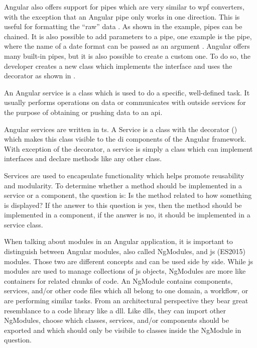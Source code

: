 Angular also offers support for pipes which are very similar to \gls{wpf} converters, with the exception that an Angular pipe only works in one direction. This is useful for formatting the \enquote{raw} data \zB {}. As shown in the example, pipes can be chained. It is also possible to add parameters to a pipe, one example is the  pipe, where the name of a date format can be passed as an argument \zB {}. Angular offers many built-in pipes, but it is also possible to create a custom one. To do so, the developer creates a new class which implements the  interface and uses the  decorator as shown in . \cite{angularTemplateSyntax}




An Angular service is a class which is used to do a specific, well-defined task. It usually performs operations on data or communicates with outside services for the purpose of obtaining or pushing data to an \gls{api}.


Angular services are written in \gls{ts}. A Service is a class with the  decorator () which makes this class visible to the \gls{di} components of the Angular framework. With exception of the decorator, a service is simply a class which can implement interfaces and declare methods like any other class.

Services are used to encapsulate functionality which helps promote reusability and modularity. To determine whether a method should be implemented in a service or a component, the question is: Is the method related to how something is displayed? If the answer to this question is yes, then the method should be implemented in a component, if the answer is no, it should be implemented in a service class.



When talking about modules in an Angular application, it is important to distinguish between Angular modules, also called NgModules, and \gls{js} (ES2015) modules. Those two are different concepts and can be used side by side. While \gls{js} modules are used to manage collections of \gls{js} objects, NgModules are more like containers for related chunks of code. An NgModule contains components, services, and/or other code files which all belong to one domain, a workflow, or are performing similar tasks. From an architectural perspective they bear great resemblance to a code library like a \gls{dll}. Like \gls{dll}s, they can import other NgModules, choose which classes, services, and/or components should be exported and which should only be visibile to classes inside the NgModule in question.

